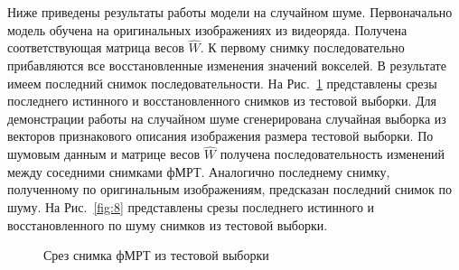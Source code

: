 \documentclass[12pt,twoside]{article}
\begin{document}
Ниже приведены результаты работы модели на случайном шуме. 
Первоначально модель обучена на оригинальных изображениях из видеоряда.
Получена соответствующая матрица весов $\hat{W}$. 
К первому снимку последовательно прибавляются все восстановленные изменения значений вокселей. 
В результате имеем последний снимок последовательности. На Рис.~\ref{fig:7} представлены срезы последнего истинного и восстановленного снимков из тестовой выборки.
Для демонстрации работы на случайном шуме сгенерирована случайная выборка из векторов признакового описания изображения размера тестовой выборки.
По шумовым данным и матрице весов $\hat{W}$ получена последовательность изменений между соседними снимками фМРТ. 
Аналогично последнему снимку, полученному по оригинальным изображениям, предсказан последний снимок по шуму. 
На Рис.~\ref{fig:8} представлены срезы последнего истинного и восстановленного по шуму снимков из тестовой выборки.
\begin{figure}[h!]
    \centering
    \hfill
    \hfill
    \caption{Срез снимка фМРТ из тестовой выборки}
    \label{fig:7}
\end{figure}
\end{document}
